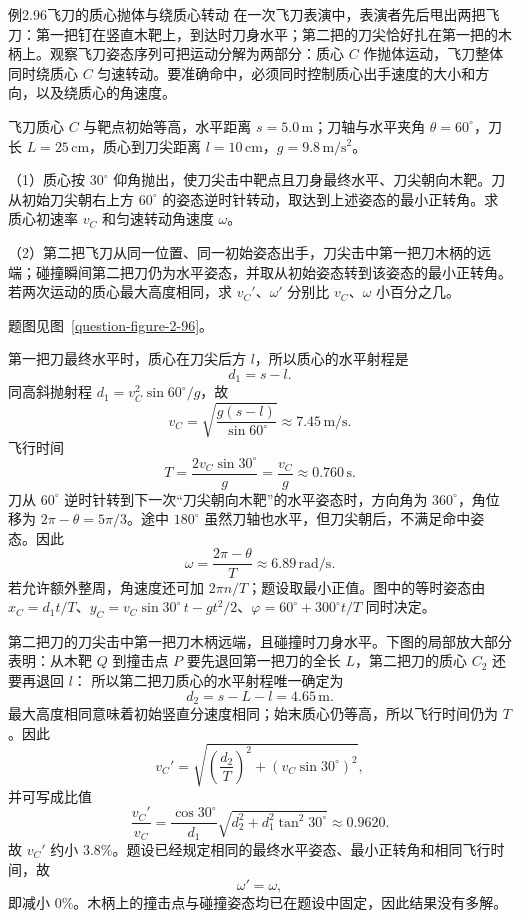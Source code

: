 \KinematicKeepSpace{18cm}
\begin{origexamplebox}{例2.96\quad 飞刀的质心抛体与绕质心转动}
在一次飞刀表演中，表演者先后甩出两把飞刀：第一把钉在竖直木靶上，到达时刀身水平；第二把的刀尖恰好扎在第一把的木柄上。观察飞刀姿态序列可把运动分解为两部分：质心 $C$ 作抛体运动，飞刀整体同时绕质心 $C$ 匀速转动。要准确命中，必须同时控制质心出手速度的大小和方向，以及绕质心的角速度。\par
飞刀质心 $C$ 与靶点初始等高，水平距离 $s=5.0\,\mathrm m$；刀轴与水平夹角 $\theta=60^\circ$，刀长 $L=25\,\mathrm{cm}$，质心到刀尖距离 $l=10\,\mathrm{cm}$，$g=9.8\,\mathrm{m/s^2}$。\par
（1）质心按 $30^\circ$ 仰角抛出，使刀尖击中靶点且刀身最终水平、刀尖朝向木靶。刀从初始刀尖朝右上方 $60^\circ$ 的姿态逆时针转动，取达到上述姿态的最小正转角。求质心初速率 $v_C$ 和匀速转动角速度 $\omega$。\par
（2）第二把飞刀从同一位置、同一初始姿态出手，刀尖击中第一把刀木柄的远端；碰撞瞬间第二把刀仍为水平姿态，并取从初始姿态转到该姿态的最小正转角。若两次运动的质心最大高度相同，求 $v_C'$、$\omega'$ 分别比 $v_C$、$\omega$ 小百分之几。
\par 题图见图~\ref{question-figure-2-96}。
\KQuestionDS
\end{origexamplebox}
\begin{xesolution}
第一把刀最终水平时，质心在刀尖后方 $l$，所以质心的水平射程是
\KnifeFlightDiagram
\[
d_1=s-l.
\]
同高斜抛射程 $d_1=v_C^2\sin60^\circ/g$，故
\[
\boxed{v_C=\sqrt{\frac{g(s-l)}{\sin60^\circ}}
\approx7.45\,\mathrm{m/s}}.
\]
飞行时间
\[
T=\frac{2v_C\sin30^\circ}{g}=\frac{v_C}{g}\approx0.760\,\mathrm s.
\]
刀从 $60^\circ$ 逆时针转到下一次“刀尖朝向木靶”的水平姿态时，方向角为 $360^\circ$，角位移为 $2\pi-\theta=5\pi/3$。途中 $180^\circ$ 虽然刀轴也水平，但刀尖朝后，不满足命中姿态。因此
\[
\boxed{\omega=\frac{2\pi-\theta}{T}\approx6.89\,\mathrm{rad/s}}.
\]
若允许额外整周，角速度还可加 $2\pi n/T$；题设取最小正值。图中的等时姿态由 $x_C=d_1t/T$、$y_C=v_C\sin30^\circ\,t-gt^2/2$、$\varphi=60^\circ+300^\circ t/T$ 同时决定。

第二把刀的刀尖击中第一把刀木柄远端，且碰撞时刀身水平。下图的局部放大部分表明：从木靶 $Q$ 到撞击点 $P$ 要先退回第一把刀的全长 $L$，第二把刀的质心 $C_2$ 还要再退回 $l$：
\KnifeImpactDiagram
所以第二把刀质心的水平射程唯一确定为
\[
d_2=s-L-l=4.65\,\mathrm m.
\]
最大高度相同意味着初始竖直分速度相同；始末质心仍等高，所以飞行时间仍为 $T$。因此
\[
v_C'=\sqrt{\left(\frac{d_2}{T}\right)^2+\left(v_C\sin30^\circ\right)^2},
\]
并可写成比值
\[
\frac{v_C'}{v_C}=\frac{\cos30^\circ}{d_1}
\sqrt{d_2^2+d_1^2\tan^2 30^\circ}\approx0.9620.
\]
故 $v_C'$ 约小 $\boxed{3.8\%}$。题设已经规定相同的最终水平姿态、最小正转角和相同飞行时间，故
\[
\boxed{\omega'=\omega},
\]
即减小 $\boxed{0\%}$。木柄上的撞击点与碰撞姿态均已在题设中固定，因此结果没有多解。
\end{xesolution}
